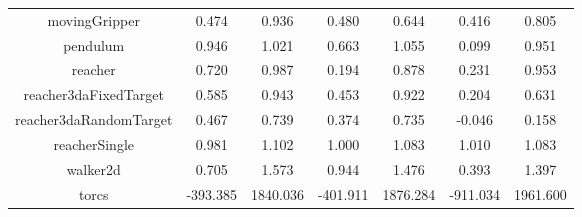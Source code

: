 \documentclass{article} %
\begin{document}
\begin{table}[t]
\begin{center}
\begin{tabular}{ c | c | c | c | c | c | c }
      movingGripper & 0.474 & 0.936 & 0.480 & 0.644 & 0.416 & 0.805 \\
      pendulum & 0.946 & 1.021 & 0.663 & 1.055 & 0.099 & 0.951 \\
      reacher & 0.720 & 0.987 & 0.194 & 0.878 & 0.231 & 0.953 \\
      reacher3daFixedTarget & 0.585 & 0.943 & 0.453 & 0.922 & 0.204 & 0.631 \\
      reacher3daRandomTarget & 0.467 & 0.739 & 0.374 & 0.735 & -0.046 & 0.158 \\
      reacherSingle & 0.981 & 1.102 & 1.000 & 1.083 & 1.010 & 1.083 \\
      walker2d & 0.705 & 1.573 & 0.944 & 1.476 & 0.393 & 1.397 \\
      \hline
      torcs & -393.385 & 1840.036 & -401.911 & 1876.284 & -911.034 & 1961.600 \\
  \end{tabular}
\end{center}
\end{table}



\end{document}
